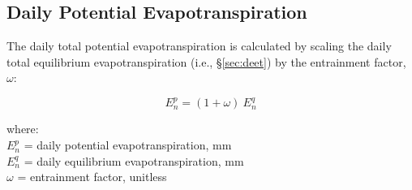 \subsection{Daily Potential Evapotranspiration}
\label{sec:dpet}
The daily total potential evapotranspiration is calculated by scaling the daily total equilibrium evapotranspiration (i.e., \S \ref{sec:deet}) by the entrainment factor, $\omega$:

\begin{equation}
\label{eq:daypet}
	E^p_n = \left(1 + \omega \right)\: E^q_n
\end{equation}

\noindent where:\\
\indent $E^p_n$ = daily potential evapotranspiration, mm\\
\indent $E^q_n$ = daily equilibrium evapotranspiration, mm\\
\indent $\omega$ = entrainment factor, unitless \\

